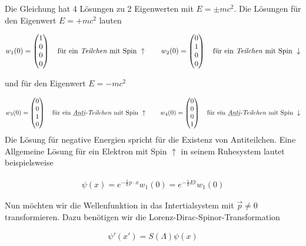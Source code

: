 Die Gleichung hat 4 Lösungen zu 2 Eigenwerten mit \(E=\pm mc^2\). Die Lösungen für den Eigenwert \(E=+mc^2\) lauten

\begin{align}
  \label{eq:8}
  w_1(0) =
  \begin{pmatrix}
    1\\0\\0\\0
  \end{pmatrix}\quad \text{für ein \textit{Teilchen} mit Spin } \uparrow
\qquad 
 w_2(0) =
  \begin{pmatrix}
    0\\1\\0\\0
  \end{pmatrix}\quad \text{für ein \textit{Teilchen} mit Spin } \downarrow
\end{align}

und für den Eigenwert \(E=-mc^2\)

\begin{align}
  \label{eq:9}
   w_3(0) =
  \begin{pmatrix}
    0\\0\\1\\0
  \end{pmatrix}\quad \text{für ein \textit{\underline{Anti}-Teilchen} mit Spin } \uparrow
\qquad 
 w_4(0) =
  \begin{pmatrix}
    0\\0\\0\\1
  \end{pmatrix}\quad \text{für ein \textit{\underline{Anti}-Teilchen} mit Spin } \downarrow
\end{align}
Die Lösung für negative Energien spricht für die Existenz von Antiteilchen. Eine Allgemeine Lösung für ein Elektron mit Spin \(\uparrow\) in seinem Ruhesystem lautet beispielsweise

\begin{align}
  \label{eq:10}
  \psi(x) = e^{-\frac{i}{\hbar}  p\cdot x}w_1(0) = e^{-\frac{i}{\hbar}Et  }w_1(0)
\end{align}

Nun möchten wir die Wellenfunktion in das Intertialsystem mit \(\vec p\ne 0\) transformieren. Dazu benötigen wir die Lorenz-Dirac-Spinor-Transformation 

\begin{align}
  \label{eq:11}
  \psi'(x') = S(\Lambda)\psi(x)
\end{align}

